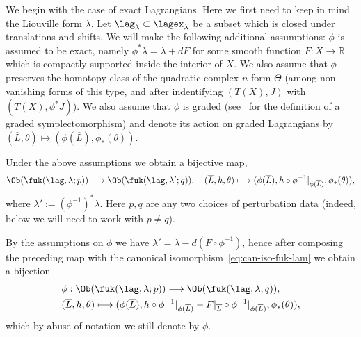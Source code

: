 We begin with the case of exact Lagrangians. Here we first need to
keep in mind the Liouville form $\lambda$. Let
$\lag_{\lambda} \subset \lagex_{\lambda}$ be a subset which is closed
under translations and shifts. We will make the following additional
assumptions: $\phi$ is assumed to be exact, namely
$\phi^*\lambda = \lambda + dF$ for some smooth function
$F: X \longrightarrow \mathbb{R}$ which is compactly supported inside
the interior of $X$. We also assume that $\phi$ preserves the homotopy
class of the quadratic complex $n$-form $\Theta$ (among non-vanishing
forms of this type, and after indentifying $(T(X),J)$ with
$(T(X), \phi^*J)$). We also assume that $\phi$ is graded
(see~\cite{Se:graded} for the definition of a graded
symplectomorphism) and denote its action on graded Lagrangians by
$(\overline{L}, \theta) \longmapsto (\phi(\overline{L}),
\phi_*(\theta))$.

Under the above assumptions we obtain a bijective map,
\begin{equation} \label{eq:phi-obj-lam-1} \Ob(\fuk(\lag, \lambda; p))
  \longrightarrow \Ob(\fuk(\lag, \lambda';q)), \quad (\overline{L}, h,
  \theta) \longmapsto (\phi(\overline{L}), h \circ
  \phi^{-1}|_{\phi(\overline{L})}, \phi_*(\theta)),
\end{equation}
where $\lambda' := (\phi^{-1})^*\lambda$. Here $p,q$ are any two
choices of perturbation data (indeed, below we will need to work with
$p \neq q$).

By the assumptions on $\phi$ we have
$\lambda' = \lambda - d(F \circ \phi^{-1})$, hence after composing the
preceding map with the canonical
isomorphism~\eqref{eq:can-iso-fuk-lam} we obtain a bijection
\begin{equation} \label{eq:phi-obj}
  \begin{aligned}
    & \phi: \Ob(\fuk(\lag, \lambda;p)) \longrightarrow \Ob(\fuk(\lag,
    \lambda;q)),
    \\
    & (\overline{L}, h, \theta) \longmapsto (\phi(\overline{L}), h
    \circ \phi^{-1}|_{\phi(\overline{L})} - F|_{\overline{L}} \circ
    \phi^{-1}|_{\phi(\overline{L})}, \phi_*(\theta)),
  \end{aligned}
\end{equation}
which by abuse of notation we still denote by $\phi$.


